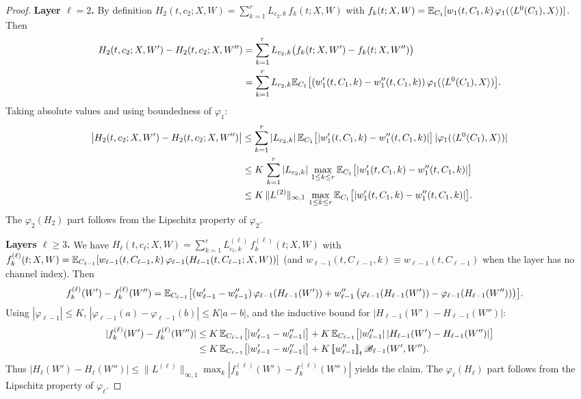 \documentclass[nohyperref]{article}
\theoremstyle{plain}
\theoremstyle{definition}
\theoremstyle{remark}
\begin{document}
\begin{proof}
\textbf{Layer $\ell=2$.}
By definition $H_2(t,c_2;X,W)=\sum_{k=1}^r L_{c_2,k}\,f_k(t;X,W)$ with $f_k(t;X,W)=\mathbb{E}_{C_1}[w_1(t,C_1,k)\,\varphi_1(\langle L^0(C_1), X \rangle)]$. Then
\begin{align*}
H_2(t,c_2;X,W')-H_2(t,c_2;X,W'') &= \sum_{k=1}^r L_{c_2,k}\big(f_k(t;X,W')-f_k(t;X,W'')\big)\\
&= \sum_{k=1}^r L_{c_2,k}\mathbb{E}_{C_1}\big[(w_1'(t,C_1,k)-w_1''(t,C_1,k))\,\varphi_1(\langle L^0(C_1), X \rangle)\big].
\end{align*}
Taking absolute values and using boundedness of $\varphi_1$:
\begin{align*}
\big|H_2(t,c_2;X,W')-H_2(t,c_2;X,W'')\big| &\le \sum_{k=1}^r |L_{c_2,k}|\,\mathbb{E}_{C_1}\big[|w_1'(t,C_1,k)-w_1''(t,C_1,k)|\big]\,|\varphi_1(\langle L^0(C_1), X \rangle)|\\
&\le K\,\sum_{k=1}^r |L_{c_2,k}|\,\max_{1\le k\le r}\mathbb{E}_{C_1}\big[|w_1'(t,C_1,k)-w_1''(t,C_1,k)|\big]\\
&\le K\,\|L^{(2)}\|_{\infty,1}\,\max_{1\le k\le r}\mathbb{E}_{C_1}\big[|w_1'(t,C_1,k)-w_1''(t,C_1,k)|\big].
\end{align*}
The $\varphi_2(H_2)$ part follows from the Lipschitz property of $\varphi_2$.

\textbf{Layers $\ell\ge 3$.}
We have $H_\ell(t,c_\ell;X,W)=\sum_{k=1}^r L^{(\ell)}_{c_\ell,k}\,f_k^{(\ell)}(t;X,W)$ with
$f_k^{(\ell)}(t;X,W)=\mathbb{E}_{C_{\ell-1}}[w_{\ell-1}(t,C_{\ell-1},k)\,\varphi_{\ell-1}(H_{\ell-1}(t,C_{\ell-1};X,W))]$
(and $w_{\ell-1}(t,C_{\ell-1},k)\equiv w_{\ell-1}(t,C_{\ell-1})$ when the layer has no channel index). Then
\begin{align*}
f_k^{(\ell)}(W')-f_k^{(\ell)}(W'')
&=\mathbb{E}_{C_{\ell-1}}\big[(w_{\ell-1}'-w_{\ell-1}'')\,\varphi_{\ell-1}(H_{\ell-1}(W'))
+w_{\ell-1}''\,\big(\varphi_{\ell-1}(H_{\ell-1}(W'))-\varphi_{\ell-1}(H_{\ell-1}(W''))\big)\big].
\end{align*}
Using $|\varphi_{\ell-1}|\le K$, $|\varphi_{\ell-1}(a)-\varphi_{\ell-1}(b)|\le K|a-b|$, and the inductive bound for $|H_{\ell-1}(W')-H_{\ell-1}(W'')|$:
\begin{align*}
|f_k^{(\ell)}(W')-f_k^{(\ell)}(W'')|
&\le K\,\mathbb{E}_{C_{\ell-1}}\big[|w_{\ell-1}'-w_{\ell-1}''|\big]
+K\,\mathbb{E}_{C_{\ell-1}}\big[|w_{\ell-1}''|\,|H_{\ell-1}(W')-H_{\ell-1}(W'')|\big]\\
&\le K\,\mathbb{E}_{C_{\ell-1}}\big[|w_{\ell-1}'-w_{\ell-1}''|\big]
+K\,{[\![ w_{\ell-1}'' ]\!]}_t\,\mathscr{B}_{\ell-1}(W',W'').
\end{align*}
Thus $|H_\ell(W')-H_\ell(W'')|\le \|L^{(\ell)}\|_{\infty,1}\max_k|f_k^{(\ell)}(W')-f_k^{(\ell)}(W'')|$ yields the claim. The $\varphi_\ell(H_\ell)$ part follows from the Lipschitz property of $\varphi_\ell$.
\end{proof}
\end{document}
